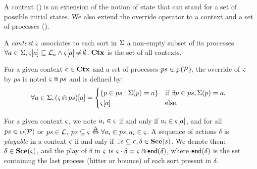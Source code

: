 A context () is an extension of the notion of state that can stand for a set of possible initial states.
We also extend the override operator to a context and a set of processes ().
\begin{definition}
\label{def:context}
  A \emph{context} $\varsigma$ associates to each sort in $\Sigma$ a non-empty subset of its processes:
  $\forall a \in \Sigma, {\varsigma[a]} \subseteq \mathcal{L}_a \wedge {\varsigma[a]} \not\nobreak\mkern -2mu = \emptyset$.
  $\mathbf{Ctx}$ is the set of all contexts.
\end{definition}
%
\begin{definition}[$\Cap: \Ctx \times \powerset(\PHproc) \rightarrow \Ctx$]
\label{def:ctxcap}
  For a given context $\varsigma\in\mathbf{Ctx}$ and a set of processes $ps \in \wp(\mathcal{P})$,
  the override of $\varsigma$ by $ps$ is noted $\varsigma \Cap ps$ and is defined by:
  \[ \forall a \in \Sigma, {(\varsigma \Cap ps)[a]} =
  \begin{cases}
    \{ p \in ps \mid \Sigma(p)=a \} & \text{if } \exists p \in ps, \Sigma(p)=a,\\
    {\varsigma[a]} & \text{else.}
  \end{cases}
  \]
\end{definition}
\noindent
For a given context $\varsigma$, we note $a_i \in \varsigma$ if and only if $a_i \in {\varsigma[a]}$,
and for all $ps \in \wp(\mathcal{P})$ or $ps \in \mathcal{L}$, $ps \subseteq \varsigma \stackrel{\Delta}\Leftrightarrow \forall a_i \in ps, a_i \in \varsigma$.
A sequence of actions $\delta$ is \emph{playable} in a context $\varsigma$ if and only if 
$\exists s \subseteq \varsigma, \delta \in \mathbf{Sce}(s)$.
We denote then: $\delta \in \mathbf{Sce}(\varsigma)$,
and the play of $\delta$ in $\varsigma$ is $\varsigma \cdot \delta = \varsigma \Cap \mathsf{end}(\delta)$,
where $\mathsf{end}(\delta)$ is the set containing the last process (hitter or bounce) of each sort present in $\delta$.

\begin{comment}
  \begin{definition}[Objective sequence ($\OS$)]
  \label{def:OS}
  \towrite{Simplifier / réécrire en dehors d'une def}
    An \emph{objective sequence} is a sequence $\w = P_1 \concat \dots \concat P_{|\w|}$,
    where $\forall n \in \indexes{\w}, \w_n \in \Obj$ and $a_i = \PHtarget(\w_n) \Rightarrow \last_a(\w_{1..n-1}) \in \{ \varnothing, a_i \}$.
    The set of all objective sequences is denoted by $\OS$.
    The definitions of $\last_a$ \todo{À définir}, $\first_a$ \todo{À définir}, $\supp$ \todo{À définir} and $\ceil$ \todo{À définir}
    are simply derived by omitting the case of hitters.
  \end{definition}
\end{comment}

